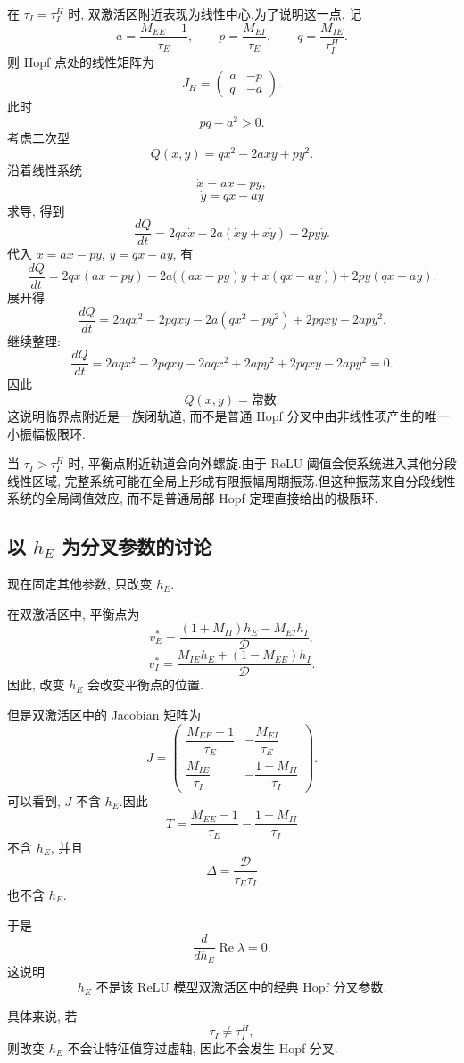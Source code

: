 ﻿\documentclass[UTF8,  zihao=-4]{ctexart}
\begin{document}
在 \(\tau_I=\tau_I^H\) 时,  双激活区附近表现为线性中心.为了说明这一点,  记
\[
a=\frac{M_{EE}-1}{\tau_E},  
\qquad
p=\frac{M_{EI}}{\tau_E},  
\qquad
q=\frac{M_{IE}}{\tau_I^H}.
\]
则 Hopf 点处的线性矩阵为
\[
J_H=
\begin{pmatrix}
a & -p\\
q & -a
\end{pmatrix}.
\]
此时
\[
pq-a^2>0.
\]
考虑二次型
\[
Q(x,  y)=qx^2-2axy+py^2.
\]
沿着线性系统
\[
\dot x=ax-py,  
\]
\[
\dot y=qx-ay
\]
求导,  得到
\[
\frac{dQ}{dt}
=
2qx\dot x-2a(\dot xy+x\dot y)+2py\dot y.
\]
代入 \(\dot x=ax-py\),  \(\dot y=qx-ay\),  有
\[
\frac{dQ}{dt}
=
2qx(ax-py)
-2a\big((ax-py)y+x(qx-ay)\big)
+2py(qx-ay).
\]
展开得
\[
\frac{dQ}{dt}
=
2aqx^2-2pqxy
-2a(qx^2-py^2)
+2pqxy-2apy^2.
\]
继续整理:
\[
\frac{dQ}{dt}
=
2aqx^2-2pqxy
-2aqx^2+2apy^2
+2pqxy-2apy^2=0.
\]
因此
\[
Q(x,  y)=\text{常数}.
\]
这说明临界点附近是一族闭轨道,  而不是普通 Hopf 分叉中由非线性项产生的唯一小振幅极限环.

当 \(\tau_I>\tau_I^H\) 时,  平衡点附近轨道会向外螺旋.由于 ReLU 阈值会使系统进入其他分段线性区域,  完整系统可能在全局上形成有限振幅周期振荡.但这种振荡来自分段线性系统的全局阈值效应,  而不是普通局部 Hopf 定理直接给出的极限环.

\subsection{以 \(h_E\) 为分叉参数的讨论}

现在固定其他参数,  只改变 \(h_E\).

在双激活区中,  平衡点为
\[
v_E^*
=
\frac{(1+M_{II})h_E-M_{EI}h_I}{\mathcal D},  
\]
\[
v_I^*
=
\frac{M_{IE}h_E+(1-M_{EE})h_I}{\mathcal D}.
\]
因此,  改变 \(h_E\) 会改变平衡点的位置.

但是双激活区中的 Jacobian 矩阵为
\[
J
=
\begin{pmatrix}
\dfrac{M_{EE}-1}{\tau_E}
&
-\dfrac{M_{EI}}{\tau_E}
\\[1.2em]
\dfrac{M_{IE}}{\tau_I}
&
-\dfrac{1+M_{II}}{\tau_I}
\end{pmatrix}.
\]
可以看到,  \(J\) 不含 \(h_E\).因此
\[
T=
\frac{M_{EE}-1}{\tau_E}
-
\frac{1+M_{II}}{\tau_I}
\]
不含 \(h_E\),  并且
\[
\Delta
=
\frac{\mathcal D}{\tau_E\tau_I}
\]
也不含 \(h_E\).

于是
\[
\frac{d}{dh_E}\operatorname{Re}\lambda=0.
\]
这说明
\[
h_E\text{ 不是该 ReLU 模型双激活区中的经典 Hopf 分叉参数.}
\]

具体来说,  若
\[
\tau_I\ne \tau_I^H,  
\]
则改变 \(h_E\) 不会让特征值穿过虚轴,  因此不会发生 Hopf 分叉.
\end{document}
